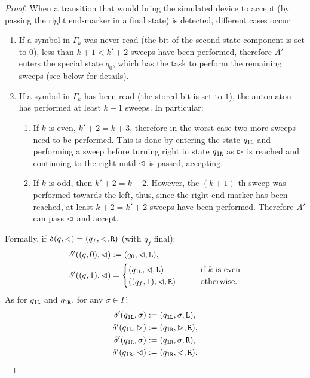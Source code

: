 \begin{proof}
	When a transition that would bring the simulated device to accept (by passing the right end-marker in a final state) is detected, different cases occur:
	\begin{enumerate}
		\item If a symbol in $\Gamma_k$ was never read (\ie the bit of the second state component is set to $0$), less than $k+1<k'+2$ sweeps have been performed, therefore $A'$ enters the special state $q_0$, which has the task to perform the remaining sweeps (see below for details).
		\item If a symbol in $\Gamma_k$ has been read (\ie the stored bit is set to $1$), the automaton has performed at least $k+1$ sweeps. In particular:
		      \begin{enumerate}
			      \item If $k$ is even, $k'+2=k+3$, therefore in the worst case two more sweeps need to be performed.
			            This is done by entering the state $q_{1\mathtt{L}}$ and performing a sweep before turning right in state $q_{1\mathtt{R}}$ as $\rhd$ is reached and continuing to the right until $\lhd$ is passed, accepting.
			      \item If $k$ is odd, then $k'+2=k+2$. However, the $(k+1)$-th sweep was performed towards the left, thus, since the right end-marker has been reached, at least $k+2=k'+2$ sweeps have been performed. Therefore $A'$ can pass $\lhd$ and accept.
		      \end{enumerate}
	\end{enumerate}

	Formally, if $\delta(q,\lhd)=(q_f,\lhd,\mathtt R)$ (with $q_f$ final):
	\begin{align*}
		\delta'((q,0),\lhd) & := (q_0,\lhd,\mathtt L) \text,                              \\
		\delta'((q,1),\lhd) & = \begin{cases}
			                        (q_{1\mathtt{L}},\lhd,\mathtt L) \qquad     & \text{if $k$ is even}   \\
			                        ((q_f,1),\lhd,\mathtt R) \qquad & \text{otherwise} \text.
		                        \end{cases}
	\end{align*}
	As for $q_{1\mathtt{L}}$ and $q_{1\mathtt{R}}$, for any $\sigma\in\Gamma$:
	\begin{align*}
		\delta'(q_{1\mathtt{L}},\sigma) & :=(q_{1\mathtt{L}},\sigma,\mathtt L) \text, \\
		\delta'(q_{1\mathtt{L}},\rhd)   & :=(q_{1\mathtt{R}},\rhd,\mathtt R) \text,   \\
		\delta'(q_{1\mathtt{R}},\sigma) & :=(q_{1\mathtt{R}},\sigma,\mathtt R) \text, \\
		\delta'(q_{1\mathtt{R}},\lhd)   & :=(q_{1\mathtt{R}},\lhd,\mathtt R) \text.
	\end{align*}


\end{proof}
